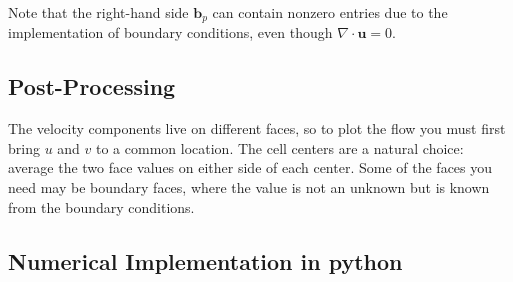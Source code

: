 Note that the right-hand side $\mathbf{b}_p$ can contain nonzero entries due to the implementation of boundary conditions, even though $\nabla \cdot \mathbf{u} = 0$.


\subsection{Post-Processing}
\label{sec:stg-post}

The velocity components live on different faces, so to plot the flow you must first bring $u$ and $v$ to a common location. The cell centers are a natural choice: average the two face values on either side of each center. Some of the faces you need may be boundary faces, where the value is not an unknown but is known from the boundary conditions.



\subsection{Numerical Implementation in python}



